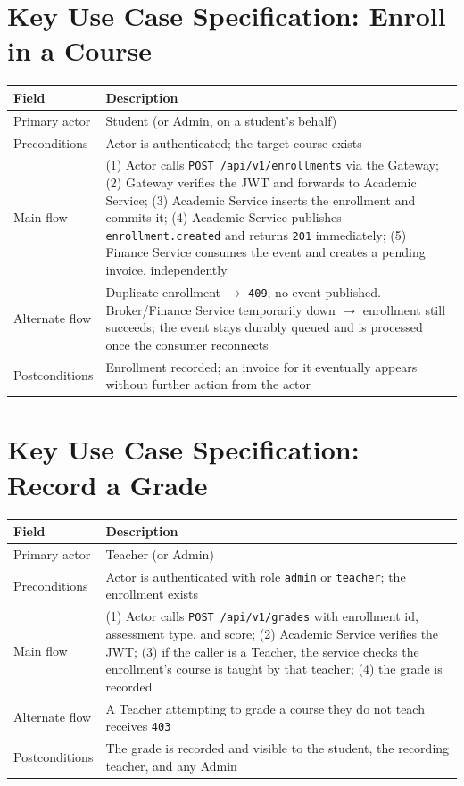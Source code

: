 \documentclass[11pt,a4paper]{report}
\begin{document}
\clearpage
\section{Key Use Case Specification: Enroll in a Course}
\begin{center}
\begin{tabular}{@{}p{3.3cm}p{10.4cm}@{}}
\toprule
\textbf{Field} & \textbf{Description} \\
\midrule
Primary actor & Student (or Admin, on a student's behalf) \\
Preconditions & Actor is authenticated; the target course exists \\
Main flow & (1) Actor calls \texttt{POST /api/v1/enrollments} via the Gateway; (2) Gateway verifies the JWT and forwards to Academic Service; (3) Academic Service inserts the enrollment and commits it; (4) Academic Service publishes \texttt{enrollment.created} and returns \texttt{201} immediately; (5) Finance Service consumes the event and creates a pending invoice, independently \\
Alternate flow & Duplicate enrollment $\rightarrow$ \texttt{409}, no event published. Broker/Finance Service temporarily down $\rightarrow$ enrollment still succeeds; the event stays durably queued and is processed once the consumer reconnects \\
Postconditions & Enrollment recorded; an invoice for it eventually appears without further action from the actor \\
\bottomrule
\end{tabular}
\end{center}

\section{Key Use Case Specification: Record a Grade}
\begin{center}
\begin{tabular}{@{}p{3.3cm}p{10.4cm}@{}}
\toprule
\textbf{Field} & \textbf{Description} \\
\midrule
Primary actor & Teacher (or Admin) \\
Preconditions & Actor is authenticated with role \texttt{admin} or \texttt{teacher}; the enrollment exists \\
Main flow & (1) Actor calls \texttt{POST /api/v1/grades} with enrollment id, assessment type, and score; (2) Academic Service verifies the JWT; (3) if the caller is a Teacher, the service checks the enrollment's course is taught by that teacher; (4) the grade is recorded \\
Alternate flow & A Teacher attempting to grade a course they do not teach receives \texttt{403} \\
Postconditions & The grade is recorded and visible to the student, the recording teacher, and any Admin \\
\bottomrule
\end{tabular}
\end{center}
\end{document}
